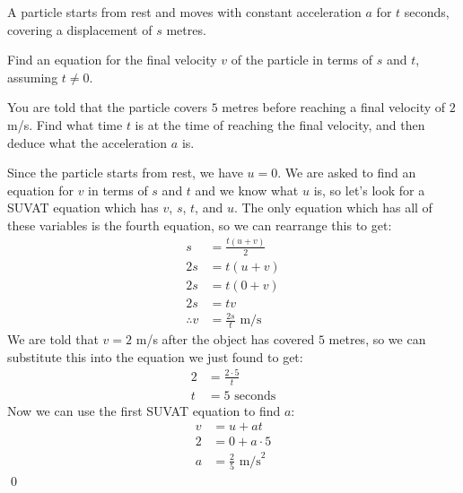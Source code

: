 \begin{example}
A particle starts from rest and moves with constant acceleration $a$ for $t$ seconds, covering a displacement of $s$ metres. 

Find an equation for the final velocity $v$ of the particle in terms of $s$ and $t$, assuming $t \neq 0$.

You are told that the particle covers $5$ metres before reaching a final velocity of $2$ m/s. Find what time $t$ is at the time of reaching the final velocity, and then deduce what the acceleration $a$ is.

\end{example}
\begin{solution}
Since the particle starts from rest, we have $u = 0$. We are asked to find an equation for $v$ in terms of $s$ and $t$ and we know what $u$ is, so let's look for a SUVAT equation which has $v$, $s$, $t$, and $u$. The only equation which has all of these variables is the fourth equation, so we can rearrange this to get:
\begin{align*}
    s &= \frac{t(u + v)}{2} \\
    2s &= t(u + v) \\
    2s &= t(0 + v) \\
    2s &= tv \\
    \therefore v &= \frac{2s}{t} \text{ m/s}
\end{align*}
We are told that $v = 2$ m/s after the object has covered $5$ metres, so we can substitute this into the equation we just found to get:
\begin{align*}
    2 &= \frac{2 \cdot 5}{t} \\
    t &= 5 \text{ seconds}
\end{align*}
Now we can use the first SUVAT equation to find $a$:
\begin{align*}
    v &= u + at \\
    2 &= 0 + a \cdot 5 \\
    a &= \frac{2}{5} \text{ m/s}^2
\end{align*}
\qed 
\end{solution}

